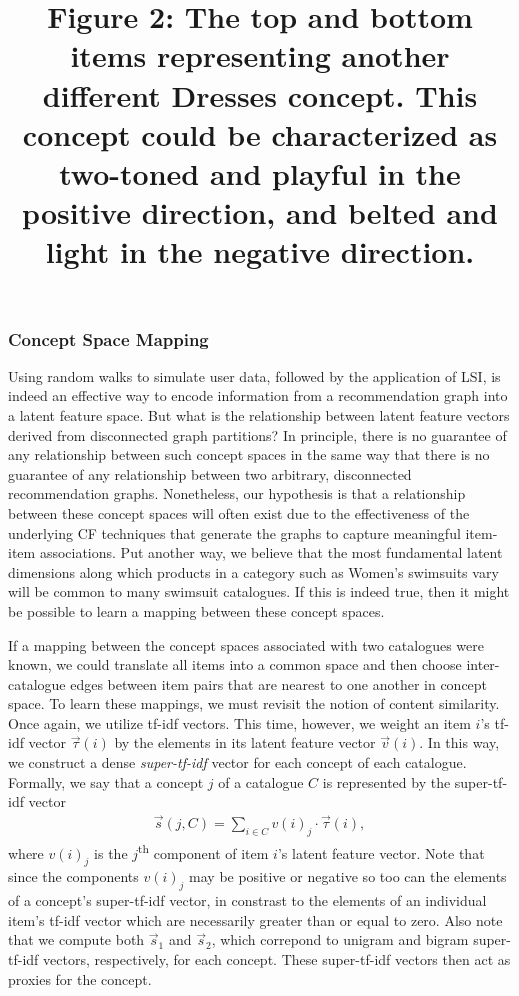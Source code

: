 \documentclass[11pt]{article}
\begin{document}
\begin{figure}
\begin{subfigure}{.18\textwidth}
\label{fig:sub2}
\end{subfigure}
\title{Figure 2: The top and bottom items representing another different Dresses
concept. This concept could be characterized as two-toned and playful in the
positive direction, and belted and light in the negative direction.}
\label{fig:conceptB} \end{figure}

\subsubsection*{Concept Space Mapping}
Using random walks to simulate user data, followed by the application of LSI, is
indeed an effective way to encode information from a recommendation graph into a
latent feature space. But what is the relationship between latent feature
vectors derived from disconnected graph partitions? In principle, there is no
guarantee of any relationship between such concept spaces in the same way that
there is no guarantee of any relationship between two arbitrary, disconnected
recommendation graphs. Nonetheless, our hypothesis is that a relationship
between these concept spaces will often exist due to the effectiveness of the
underlying CF techniques that generate the graphs to capture meaningful
item-item associations. Put another way, we believe that the most fundamental
latent dimensions along which products in a category such as Women's swimsuits
vary will be common to many swimsuit catalogues. If this is indeed true, then it
might be possible to learn a mapping between these concept spaces.

If a mapping between the concept spaces associated with two catalogues were
known, we could translate all items into a common space and then choose
inter-catalogue edges between item pairs that are nearest to one another in
concept space. To learn these mappings, we must revisit the notion of content
similarity. Once again, we utilize tf-idf vectors. This time, however, we weight
an item $i$'s tf-idf vector $\vec{\tau}(i)$ by the elements in its latent
feature vector $\vec{v}(i)$. In this way, we construct a dense {\em
super-tf-idf} vector for each concept of each catalogue. Formally, we say that
a concept $j$ of a catalogue $C$ is represented by the super-tf-idf vector
\begin{align}
\vec{s}(j,C) = \sum_{i \in C}{v(i)_j \cdot \vec{\tau}(i)},
\end{align}
where $v(i)_j$ is the $j$\textsuperscript{th} component of item $i$'s latent
feature vector. Note that since the components $v(i)_j$ may be positive or
negative so too can the elements of a concept's super-tf-idf vector, in
constrast to the elements of an individual item's tf-idf vector which are
necessarily greater than or equal to zero. Also note that we compute both
$\vec{s}_1$ and $\vec{s}_2$, which correpond to unigram and bigram super-tf-idf
vectors, respectively, for each concept. These super-tf-idf vectors then act as
proxies for the concept.
\end{document}
